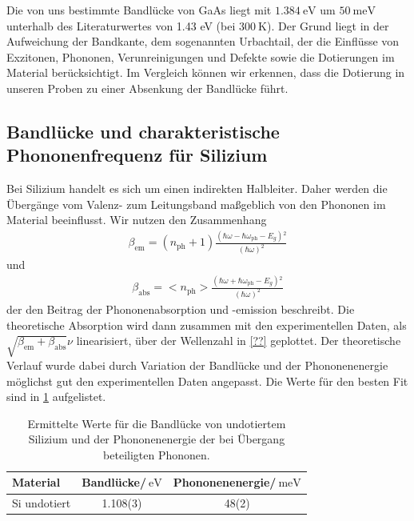 \documentclass[paper=a4,fontsize=10pt,DIV=18,twocolumn,parskip=half]{scrartcl}
\numberwithin{equation}{section}    %
\begin{document}
Die von uns bestimmte Bandlücke von GaAs liegt mit $\SI{1.384}{\eV}$ um $\SI{50}{\milli\eV}$ unterhalb des Literaturwertes von 1.43 eV (bei $\SI{300}{\K}$). Der Grund liegt in der Aufweichung der Bandkante, dem sogenannten Urbachtail, der die Einflüsse von
Exzitonen, Phononen, Verunreinigungen und Defekte sowie die Dotierungen im Material berücksichtigt. Im Vergleich können wir erkennen, dass die Dotierung in unseren Proben zu einer Absenkung der Bandlücke führt.

\subsection{Bandlücke und charakteristische Phononenfrequenz für Silizium}

Bei Silizium handelt es sich um einen indirekten Halbleiter. Daher werden die Übergänge vom Valenz- zum Leitungsband maßgeblich von den Phononen im Material beeinflusst. Wir nutzen den Zusammenhang 
\begin{align}
\beta _{\text{em} }=\left(n_{\text{ph}}+1\right)\frac{\left(\hbar \omega -\hbar \omega _{\text{ph}}-E_g\right){}^2}{(\hbar \omega )^2}
\end{align}
und 
\begin{align}
\beta _{\text{abs} }=<n_{\text{ph}}>\frac{\left(\hbar \omega +\hbar \omega _{\text{ph}}-E_g\right){}^2}{(\hbar \omega )^2}
\end{align}
der den Beitrag der Phononenabsorption und \mbox{-emission} beschreibt. Die theoretische Absorption wird dann zusammen mit den experimentellen Daten, als $\sqrt{\beta _{\text{em} }+\beta _{\text{abs} }}\nu $ linearisiert, über der Wellenzahl in \cref{??} geplottet. Der theoretische Verlauf wurde dabei durch Variation der Bandlücke und der Phononenenergie möglichst gut den experimentellen Daten angepasst. Die Werte für den besten Fit sind in \cref{phe} aufgelistet.
\begin{table}
	\begin{center}
\begin{tabular}{ l | c c }
  Material & Bandlücke/$\SI{}{\eV}$ & Phononenenergie/$\SI{}{\milli\eV}$\\
  \hline
  Si undotiert & 1.108(3) & 48(2)
\end{tabular}
  \caption{Ermittelte Werte für die Bandlücke von undotiertem Silizium und der Phononenenergie der bei Übergang beteiligten Phononen.}
  \label{phe}
	\end{center}
\end{table}
\end{document}
